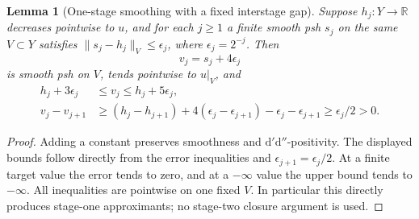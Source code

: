 \documentclass[11pt]{article}
\newtheorem{lemma}[theorem]{Lemma}
\theoremstyle{remark}
\newcommand{\dd}{\mathrm d'\mathrm d''}
\begin{document}
\begin{lemma}[One-stage smoothing with a fixed interstage gap]
Suppose $h_j:Y\to\mathbb R$ decreases pointwise to $u$, and for each
$j\geq1$ a finite smooth psh $s_j$ on the same $V\subset Y$ satisfies
$\|s_j-h_j\|_V\leq\epsilon_j$, where $\epsilon_j=2^{-j}$.
Then
\[
 v_j=s_j+4\epsilon_j
\]
is smooth psh on $V$, tends pointwise to $u|_V$, and
\begin{align*}
 h_j+3\epsilon_j&\leq v_j\leq h_j+5\epsilon_j,\\
 v_j-v_{j+1}&\geq(h_j-h_{j+1})+
 4(\epsilon_j-\epsilon_{j+1})-\epsilon_j-\epsilon_{j+1}
 \geq\epsilon_j/2>0.
\end{align*}
\end{lemma}
\begin{proof}
Adding a constant preserves smoothness and $\dd$-positivity.
The displayed bounds follow directly from the error inequalities and
$\epsilon_{j+1}=\epsilon_j/2$. At a finite target value the error tends to
zero, and at a $-\infty$ value the upper bound tends to $-\infty$.
All inequalities are pointwise on one fixed $V$. In particular this directly
produces stage-one approximants; no stage-two closure argument is used.
\end{proof}
\end{document}

